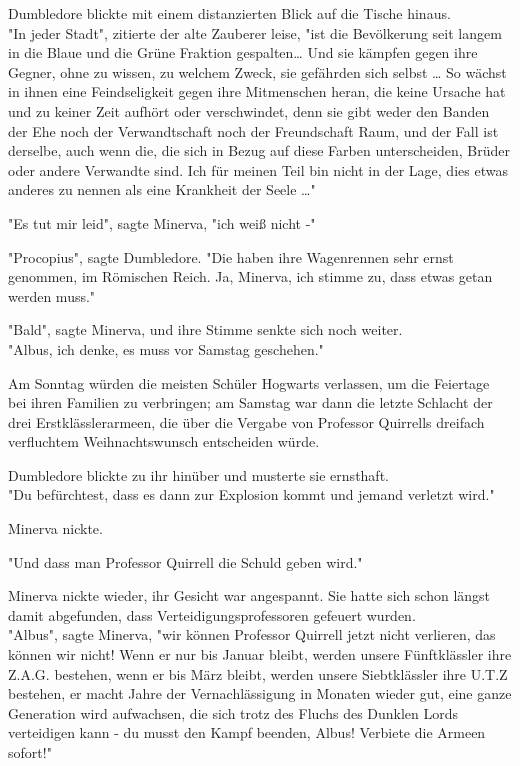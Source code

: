 {Dumbledore blickte mit einem distanzierten Blick auf die Tische hinaus.\\ "In jeder Stadt", zitierte der alte Zauberer leise, "ist die Bevölkerung seit langem in die Blaue und die Grüne Fraktion gespalten… Und sie kämpfen gegen ihre Gegner, ohne zu wissen, zu welchem Zweck, sie gefährden sich selbst … So wächst in ihnen eine Feindseligkeit gegen ihre Mitmenschen heran, die keine Ursache hat und zu keiner Zeit aufhört oder verschwindet, denn sie gibt weder den Banden der Ehe noch der Verwandtschaft noch der Freundschaft Raum, und der Fall ist derselbe, auch wenn die, die sich in Bezug auf diese Farben unterscheiden, Brüder oder andere Verwandte sind. Ich für meinen Teil bin nicht in der Lage, dies etwas anderes zu nennen als eine Krankheit der Seele …"

"Es tut mir leid", sagte Minerva, "ich weiß nicht -"

"Procopius", sagte Dumbledore. "Die haben ihre Wagenrennen sehr ernst genommen, im Römischen Reich. Ja, Minerva, ich stimme zu, dass etwas getan werden muss."

"Bald", sagte Minerva, und ihre Stimme senkte sich noch weiter.\\ "Albus, ich denke, es muss vor Samstag geschehen."

Am Sonntag würden die meisten Schüler Hogwarts verlassen, um die Feiertage bei ihren Familien zu verbringen; am Samstag war dann die letzte Schlacht der drei Erstklässlerarmeen, die über die Vergabe von Professor Quirrells dreifach verfluchtem Weihnachtswunsch entscheiden würde.

Dumbledore blickte zu ihr hinüber und musterte sie ernsthaft.\\ "Du befürchtest, dass es dann zur Explosion kommt und jemand verletzt wird."

Minerva nickte.

"Und dass man Professor Quirrell die Schuld geben wird."

Minerva nickte wieder, ihr Gesicht war angespannt. Sie hatte sich schon längst damit abgefunden, dass Verteidigungsprofessoren gefeuert wurden.\\ "Albus", sagte Minerva, "wir können Professor Quirrell jetzt nicht verlieren, das können wir nicht! Wenn er nur bis Januar bleibt, werden unsere Fünftklässler ihre Z.A.G. bestehen, wenn er bis März bleibt, werden unsere Siebtklässler ihre U.T.Z bestehen, er macht Jahre der Vernachlässigung in Monaten wieder gut, eine ganze Generation wird aufwachsen, die sich trotz des Fluchs des Dunklen Lords verteidigen kann - du musst den Kampf beenden, Albus! Verbiete die Armeen sofort!"

}
